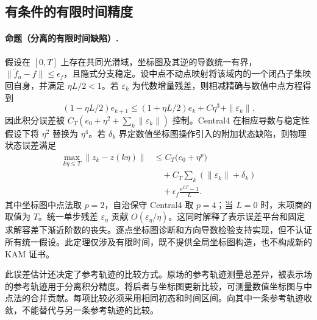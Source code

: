 \subsection{有条件的有限时间精度}
\paragraph{命题（分离的有限时间缺陷）.}\label{thm:finite-time}
假设在 $[0,T]$ 上存在共同光滑域，坐标图及其逆的导数统一有界，$\|\widetilde f_a-f\|\le\epsilon_f$，且隐式分支稳定。设中点不动点映射将该域内的一个闭凸子集映回自身，并满足 $\eta L/2<1$。若 $\varepsilon_k$ 为代数增量残差，则相减精确与数值中点方程得到
\begin{equation}
 (1-\eta L/2)e_{k+1}\le(1+\eta L/2)e_k+C\eta^3+\|\varepsilon_k\|.
 \label{eq:th-residual-recursion}
\end{equation}
因此积分误差被 $C_T(e_0+\eta^2+\sum_k\|\varepsilon_k\|)$ 控制。Central4 在相应导数与稳定性假设下将 $\eta^2$ 替换为 $\eta^4$。若 $\delta_k$ 界定数值坐标图操作引入的附加状态缺陷，则物理状态误差满足
\begin{equation}
 \begin{aligned}
 \max_{k\eta\le T}\|z_k-z(k\eta)\|
 &\le C_T\bigl(e_0+\eta^p\bigr)\\
 &\quad+C_T\sum_k(\|\varepsilon_k\|+\delta_k)\\
 &\quad+\epsilon_f\frac{e^{LT}-1}{L}.
\end{aligned}
 \label{eq:th-error-bound}
\end{equation}
其中坐标图中点法取 $p=2$，自治保守 Central4 取 $p=4$；当 $L=0$ 时，末项商的取值为 $T$。统一单步残差 $\varepsilon_\eta$ 贡献 $O(\varepsilon_\eta/\eta)$。这同时解释了表示误差平台和固定求解容差下渐近阶数的丧失。逐点坐标图诊断和方向导数检验支持实现，但不认证所有统一假设。此定理仅涉及有限时间，既不提供全局坐标图构造，也不构成新的 KAM 证书。

此误差估计还决定了参考轨迹的比较方式。原场的参考轨迹测量总差异，被表示场的参考轨迹用于分离积分精度。将后者与坐标图更新比较，可测量数值坐标图与中点法的合并贡献。每项比较必须采用相同初态和时间区间。向其中一条参考轨迹收敛，不能替代与另一条参考轨迹的比较。
